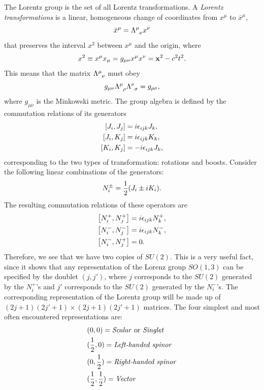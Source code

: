 The Lorentz group is the set of all Lorentz transformations. A \emph{Lorentz transformations} is a linear, homogeneous change of coordinates from $x^{\mu}$ to $\bar{x}^{\mu}$,
\begin{equation}
\bar{x}^{\mu}=\tensor{\Lambda}{^{\mu}_{\nu}}x^{\nu}
\end{equation}
that preserves the interval $x^2$ between $x^{\mu}$ and the origin, where
\begin{equation}
x^2\equiv x^{\mu} x_{\mu}=g_{\mu\nu}x^{\mu}x^{\nu}=\vb{x}^2-c^2t^2.
\end{equation}
This means that the matrix $\tensor{\Lambda}{^{\mu}_{\nu}}$ must obey
\begin{equation}
g_{\mu\nu}\tensor{\Lambda}{^{\mu}_{\rho}}\tensor{\Lambda}{^{\nu}_{\sigma}}=g_{\rho\sigma},
\end{equation}
where $g_{\mu\nu}$ is the Minkowski metric. The group algebra is defined by the commutation relations of its generators
\begin{equation}
\begin{split}
\comm{J_i}{J_j}&=i\epsilon_{ijk}J_k, \\
\comm{J_i}{K_j}&=i\epsilon_{ijk}K_k, \\
\comm{K_i}{K_j}&=-i\epsilon_{ijk}J_k, \\
\end{split}
\end{equation}
corresponding to the two types of transformation: rotations and boosts. Consider the following linear combinations of the generators:
\begin{equation}
N^{\pm}_{i}=\frac{1}{2}\qty(J_i\pm iK_i).
\end{equation}
The resulting commutation relations of these operators are
\begin{equation}
\begin{split}
\comm{N_i^+}{N_j^+}&=i\epsilon_{ijk}N_k^+, \\
\comm{N_i^-}{N_j^-}&=i\epsilon_{ijk}N_k^-, \\
\comm{N_i^-}{N_j^+}&=0. \\
\end{split}
\end{equation}
Therefore, we see that we have two copies of $SU(2)$. This is a very useful fact, since it shows that any representation of the Lorenz group $SO(1,3)$ can be specified by the doublet $(j,j')$, where $j$ corresponds to the $SU(2)$ generated by the $N_i^+$'s and $j'$ corresponds to the $SU(2)$ generated by the $N_i^-$'s. The corresponding representation of the Lorentz group will be made up of $(2j+1)(2j'+1)\times (2j+1)(2j'+1)$ matrices. The four simplest and most often encountered representations are:
\begin{equation}
\begin{split}
&(0,0)=\text{\emph{Scalar} or \emph{Singlet}}\\
&(\frac{1}{2},0)=\text{\emph{Left-handed spinor}}\\
&(0,\frac{1}{2})=\text{\emph{Right-handed spinor}}\\
&(\frac{1}{2},\frac{1}{2})=\text{\emph{Vector}}
\end{split}
\end{equation}

